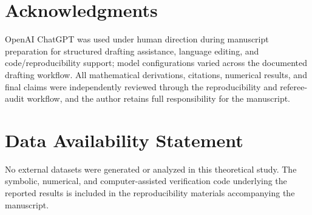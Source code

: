 \documentclass[11pt]{article}
\begin{document}
\section*{Acknowledgments}
OpenAI ChatGPT was used under human direction during manuscript preparation for structured drafting assistance, language editing, and code/reproducibility support; model configurations varied across the documented drafting workflow. All mathematical derivations, citations, numerical results, and final claims were independently reviewed through the reproducibility and referee-audit workflow, and the author retains full responsibility for the manuscript.

\section*{Data Availability Statement}
No external datasets were generated or analyzed in this theoretical study. The symbolic, numerical, and computer-assisted verification code underlying the reported results is included in the reproducibility materials accompanying the manuscript.




\end{document}
